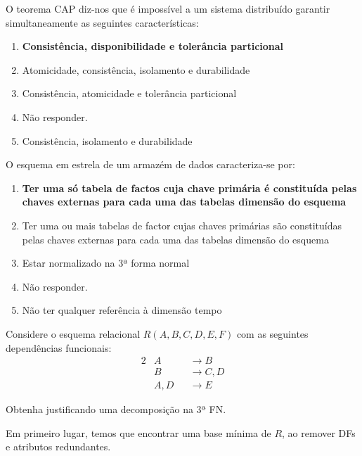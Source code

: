 \documentclass[type=normal, year=2014/15]{bdad_exam}
\begin{document}
{
O teorema CAP diz-nos que é impossível a um sistema distribuído garantir simultaneamente as seguintes características:
\begin{enumerate}[label=\alph*.]\itemsep0em
    \item \textbf{Consistência, disponibilidade e tolerância particional \greencheckmark}
    \item Atomicidade, consistência, isolamento e durabilidade
    \item Consistência, atomicidade e tolerância particional
    \item Não responder.
    \item Consistência, isolamento e durabilidade
\end{enumerate}

O esquema em estrela de um armazém de dados caracteriza-se por:
\begin{enumerate}[label=\alph*.]\itemsep0em
    \item \textbf{Ter uma só tabela de factos cuja chave primária é constituída pelas chaves externas para cada uma das tabelas dimensão do esquema \greencheckmark}
    \item Ter uma ou mais tabelas de factor cujas chaves primárias são constituídas pelas chaves externas para cada uma das tabelas dimensão do esquema
    \item Estar normalizado na 3ª forma normal
    \item Não responder.
    \item Não ter qualquer referência à dimensão tempo
\end{enumerate}

Considere o esquema relacional $R(A,B,C,D,E,F)$ com as seguintes dependências funcionais:
\begin{alignat*}{2}
    & A    && \rightarrow B    \\
    & B    && \rightarrow C, D \\
    & A, D && \rightarrow E
\end{alignat*}

Obtenha justificando uma decomposição na 3ª FN.

\ansseparator

Em primeiro lugar, temos que encontrar uma base mínima de $R$, ao remover DFs e atributos redundantes.

}
\end{document}
